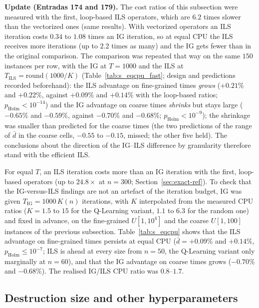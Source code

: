 \documentclass[final,3p,times,11pt,authoryear]{elsarticle}
\begin{document}
\textbf{Update (Entradas 174 and 179).} The cost ratios of this subsection were measured with the first, loop-based ILS operators, which are $6.2$ times slower than the vectorized ones (same results). With vectorized operators an ILS iteration costs $0.34$ to $1.08$ times an IG iteration, so
at equal CPU the ILS receives more iterations (up to $2.2$ times as many) and the IG gets fewer than in the original comparison. The comparison was repeated that way on the same $150$ instances per row, with the IG at $T=1000$ and the ILS at $T_{\mathrm{ILS}}=\mathrm{round}(1000/K)$ (Table~\ref{tab:s_eqcpu_fast}; design and predictions recorded beforehand): the ILS advantage on fine-grained times
\emph{grows} ($+0.21\%$ and $+0.22\%$, against $+0.09\%$ and $+0.14\%$ with the loop-based ratios; $p_{\mathrm{Holm}}<10^{-14}$) and the IG advantage on coarse times \emph{shrinks} but stays large ($-0.65\%$ and $-0.59\%$, against $-0.70\%$ and $-0.68\%$; $p_{\mathrm{Holm}}<10^{-9}$); the shrinkage was smaller than predicted for the coarse times
(the two predictions of the range of $\bar d$ in the coarse cells, $-0.55$ to $-0.15$, missed; the other five held). The conclusions about the direction of the IG--ILS difference by granularity therefore stand with the efficient ILS.

For equal $T$, an ILS iteration costs more than an IG iteration with the first, loop-based operators (up to
$24.8\times$ at $n=300$; Section~\ref{sec:exact-ref}). To check that
the IG-versus-ILS findings are not an artefact of the iteration budget,
IG was given $T_{\mathrm{IG}}=1000\,K(n)$ iterations, with $K$ interpolated
from the measured CPU ratios ($K=1.5$ to $15$ for the Q-Learning variant,
$1.1$ to $6.3$ for the random one) and fixed in advance, on the
fine-grained $U[1,10^4]$ and the coarse $U[1,100]$ instances of the
previous subsection. Table~\ref{tab:s_eqcpu} shows that the ILS advantage
on fine-grained times persists at equal CPU ($\bar d=+0.09\%$ and
$+0.14\%$, $p_{\mathrm{Holm}}\leq10^{-7}$; ILS is ahead at every size from $n=50$, the Q-Learning variant only marginally at $n=60$),
and that the IG advantage on coarse times grows ($-0.70\%$ and $-0.68\%$).
The realised IG/ILS CPU ratio was $0.8$--$1.7$.




\subsection{Destruction size and other hyperparameters}
\label{sec:hyper}
\end{document}

